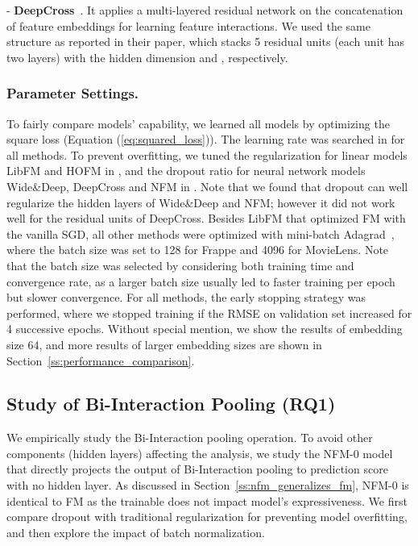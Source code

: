- \textbf{DeepCross}~\cite{DeepCross}. It applies a multi-layered residual network on the concatenation of feature embeddings for learning feature interactions. We used the same structure as reported in their paper, which stacks 5 residual units (each unit has two layers) with the hidden dimension  and , respectively. 

\subsubsection{\textbf{Parameter Settings.}}
To fairly compare models' capability, we learned all models by optimizing the square loss (Equation (\ref{eq:squared_loss})). The learning rate was searched in  for all methods. 
To prevent overfitting, we tuned the  regularization for linear models LibFM and HOFM in , and the dropout ratio for neural network models Wide\&Deep, DeepCross and NFM in . 
Note that we found that dropout can well regularize the hidden layers of Wide\&Deep and NFM; however it did not work well for the residual units of DeepCross. 
Besides LibFM that optimized FM with the vanilla SGD, all other methods were optimized with mini-batch Adagrad~\cite{Adagrad}, where the batch size was set to 128 for Frappe and 4096 for MovieLens. Note that the batch size was selected by considering both training time and convergence rate, as a larger batch size usually led to faster training per epoch but slower convergence. 
For all methods, the early stopping strategy was performed, where we stopped training if the RMSE on validation set increased for 4 successive epochs. 
Without special mention, we show the results of embedding size 64, and more results of larger embedding sizes are shown in Section~\ref{ss:performance_comparison}.

\subsection{Study of Bi-Interaction Pooling (RQ1)}
We empirically study the Bi-Interaction pooling operation. 
To avoid other components (\eg hidden layers) affecting the analysis, we study the NFM-0 model that directly projects the output of Bi-Interaction pooling to prediction score with no hidden layer. As discussed in Section~\ref{ss:nfm_generalizes_fm}, NFM-0 is identical to FM as the trainable  does not impact model's expressiveness. We first compare dropout with traditional  regularization for preventing model overfitting, and then explore the impact of batch normalization. 

